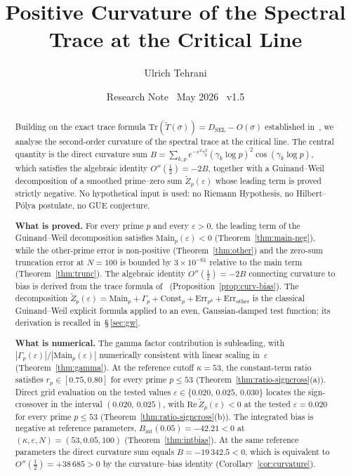 \documentclass[11pt]{article}
\title{\vspace{-1.5em}\bfseries Positive Curvature of the Spectral Trace
at the Critical Line}
\author{Ulrich Tehrani}
\date{Research Note \textperiodcentered\ May 2026
      \textperiodcentered\ v1.5}
\newcommand{\Tt}{\widetilde{T}}
\newcommand{\Zt}{\widetilde{Z}}
\newcommand{\DSEL}{D_{\mathrm{SEL}}}
\begin{document}
\maketitle

\begin{abstract}
Building on the exact trace formula $\mathrm{Tr}(\Tt(\sigma))=\DSEL-O(\sigma)$
established in~\cite{Paper5}, we analyse the second-order curvature of the
spectral trace at the critical line.
The central quantity is the direct curvature sum
$B=\sum_{k,p} e^{-\varepsilon^2\gamma_k^2}(\gamma_k\log p)^2\cos(\gamma_k\log p)$,
which satisfies the algebraic identity $O''(\tfrac12)=-2B$, together with a
Guinand--Weil decomposition of a smoothed prime--zero sum $\Zt_p(\varepsilon)$
whose leading term is proved strictly negative.
No hypothetical input is used: no Riemann Hypothesis, no Hilbert--P\'olya
postulate, no GUE conjecture.

\textbf{What is proved.}
For every prime $p$ and every $\varepsilon>0$, the leading term of the
Guinand--Weil decomposition satisfies
$\mathrm{Main}_p(\varepsilon)<0$ (Theorem~\ref{thm:main-neg}), while the
other-prime error is non-positive
(Theorem~\ref{thm:other}) and the zero-sum truncation error at $N=100$
is bounded by $3\times 10^{-61}$ relative to the main term
(Theorem~\ref{thm:trunc}).
The algebraic identity $O''(\tfrac12)=-2B$ connecting curvature to bias
is derived from the trace formula of~\cite{Paper5}
(Proposition~\ref{prop:curv-bias}).
The decomposition
$\Zt_p(\varepsilon)=\mathrm{Main}_p+\Gamma_p+\mathrm{Const}_p
+\mathrm{Err}_{p^k}+\mathrm{Err}_{\mathrm{other}}$
is the classical Guinand--Weil explicit formula applied to an even,
Gaussian-damped test function; its derivation is recalled in~\S\,\ref{sec:gw}.

\textbf{What is numerical.}
The gamma factor contribution is subleading, with
$|\Gamma_p(\varepsilon)|/|\mathrm{Main}_p(\varepsilon)|$ numerically
consistent with linear scaling in~$\varepsilon$
(Theorem~\ref{thm:gamma}).
At the reference cutoff $\kappa=53$, the constant-term ratio satisfies
$r_p\in[0.75,0.80]$ for every prime $p\le 53$
(Theorem~\ref{thm:ratio-signcross}(a)).
Direct grid evaluation on the tested values
$\varepsilon\in\{0.020,\,0.025,\,0.030\}$ locates the sign-crossover
in the interval $(0.020,\,0.025)$, with
$\mathrm{Re}\,\Zt_p(\varepsilon)<0$ at the tested $\varepsilon=0.020$
for every prime $p\le 53$ (Theorem~\ref{thm:ratio-signcross}(b)).
The integrated bias is negative at reference parameters,
$B_{\mathrm{int}}(0.05)=-42.21<0$ at
$(\kappa,\varepsilon,N)=(53,0.05,100)$ (Theorem~\ref{thm:intbias}).
At the same reference parameters the direct curvature sum equals
$B=-19\,342.5<0$, which is equivalent to
$O''(\tfrac12)=+38\,685>0$ by the curvature--bias identity
(Corollary~\ref{cor:curvature}).


\end{abstract}
\end{document}
